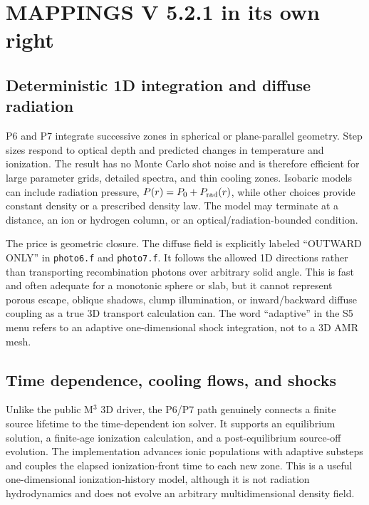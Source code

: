 \documentclass[english,a4paper]{my_memo}
\newcommand{\code}[1]{\texttt{#1}}
\newcommand{\Mthree}{M$^3$}
\begin{document}
\section{MAPPINGS V 5.2.1 in its own right}

\subsection{Deterministic 1D integration and diffuse radiation}

P6 and P7 integrate successive zones in spherical or plane-parallel
geometry.  Step sizes respond to optical depth and predicted changes in
temperature and ionization.  The result has no Monte Carlo shot noise and
is therefore efficient for large parameter grids, detailed spectra, and
thin cooling zones.  Isobaric models can include radiation pressure,
$P(r)=P_0+P_{\rm rad}(r)$, while other choices provide constant density or
a prescribed density law.  The model may terminate at a distance, an ion
or hydrogen column, or an optical/radiation-bounded condition.

The price is geometric closure.  The diffuse field is explicitly labeled
``OUTWARD ONLY'' in \code{photo6.f} and \code{photo7.f}.  It follows the
allowed 1D directions rather than transporting recombination photons over
arbitrary solid angle.  This is fast and often adequate for a monotonic
sphere or slab, but it cannot represent porous escape, oblique shadows,
clump illumination, or inward/backward diffuse coupling as a true 3D
transport calculation can.  The word ``adaptive'' in the S5 menu refers
to an adaptive one-dimensional shock integration, not to a 3D AMR mesh.

\subsection{Time dependence, cooling flows, and shocks}
\label{sec:mapstrength}

Unlike the public \Mthree{} 3D driver, the P6/P7 path genuinely connects a
finite source lifetime to the time-dependent ion solver.  It supports an
equilibrium solution, a finite-age ionization calculation, and a
post-equilibrium source-off evolution.  The implementation advances ionic
populations with adaptive substeps and couples the elapsed ionization-front
time to each new zone.  This is a useful one-dimensional ionization-history
model, although it is not radiation hydrodynamics and does not evolve an
arbitrary multidimensional density field.
\end{document}
